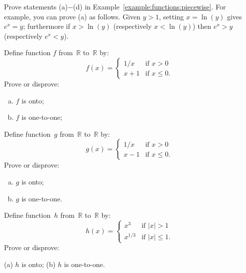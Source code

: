 \begin{exercise}{}
Prove statements (a)$-$(d) in Example~\ref{example:functions:piecewise}.  For example, you can prove (a)  as follows. Given $y>1$, setting $x = \ln(y)$ gives $e^x = y$; furthermore if $x > \ln(y)$ (respectively  $x < \ln(y)$) then $e^x > y$ (respectively $e^x < y$).
\end{exercise}



\begin{exercise}{} \label{OntoCasesExer}
 Define function $f$  from~$\mathbb{R}$ to~$\mathbb{R}$ by:
$$ f(x) = 
\begin{cases}
1/x & \mbox{if $x > 0$} \\
x + 1 & \mbox{if $x \le 0$.}
\end{cases} $$
Prove or disprove:
\begin{multicols}{2}
 \begin{enumerate}[(a)]
 \item \label{OntoCasesExer-fOnto}
 $f$ is onto;
 \item \label{OntoCasesExer-fNot11}
 $f$ is one-to-one;
\end{enumerate}
\end{multicols}
\end{exercise}

\begin{exercise}{} \label{OntoCasesExer2}
 Define function~$g$ from~$\mathbb{R}$ to~$\mathbb{R}$ by:
$$ g(x) = 
\begin{cases}
1/x & \mbox{if $x > 0$} \\
x - 1 & \mbox{if $x \le 0$}
 . \end{cases} $$
Prove or disprove:
\begin{multicols}{2}
 \begin{enumerate}[(a)]
 \item \label{OntoCasesExer-gNotOnto}
 $g$ is onto;
 \item \label{OntoCasesExer-g11} 
 $g$ is one-to-one.
\end{enumerate}
\end{multicols}
\end{exercise}

\begin{exercise}{} \label{OntoCasesExer2}
 Define function~$h$ from~$\mathbb{R}$ to~$\mathbb{R}$ by:
$$ h(x) = 
\begin{cases}
x^{3} & \mbox{if $|x| > 1$} \\
x^{1/3} & \mbox{if $|x| \le 1$}
 . \end{cases} $$
Prove or disprove:

(a) \qquad  $h$ is onto; \qquad \qquad (b)  $h$ is one-to-one.
\end{exercise}


